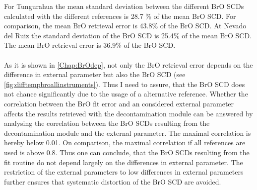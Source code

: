 \documentclass  [
  paper    = a4,
  BCOR     = 10mm,
  twoside,
  fontsize = 12pt,
  fleqn,
  toc      = bibnumbered,
  toc      = listofnumbered,
  numbers  = noendperiod,
  headings = normal,
  listof   = leveldown,
  version  = 3.03
]                                       {scrreprt}
\begin{document}
	For Tungurahua the mean standard deviation between the different BrO SCDs calculated with the different references is 28.7 \% of the mean BrO SCD. For comparison, the mean BrO retrieval error is 43.8\% of the BrO SCD.
	At Nevado del Ruiz the standard deviation of the BrO SCD is 25.4\% of the mean BrO SCD. The mean BrO retrieval error is 36.9\% of the BrO SCD.\\
	\\
	As it is shown in \cref{Chap:BrOdep}, not only the BrO retrieval error depends on the difference in external parameter but also the BrO SCD (see \cref{fig:difftempbroallinstruments}). 
	Thus I need to assure, that the BrO SCD does not chance significantly due to the usage of a alternative reference.
	Whether the correlation between the BrO fit error and an considered external parameter  affects the results retrieved with the decontamination module can be answered by analysing the correlation between the BrO SCDs resulting from the decontamination module and the external parameter.
	The maximal correlation is hereby below 0.01. 
	On comparison, the maximal correlation if all references are used is above 0.8. Thus one can conclude, that the BrO SCDs resulting from the fit routine do not depend largely on the differences in external parameter. The restriction of the external parameters to low differences in external parameters further ensures that systematic distortion of the BrO SCD are avoided. \\
		
%	
%
%
%
\end{document}
